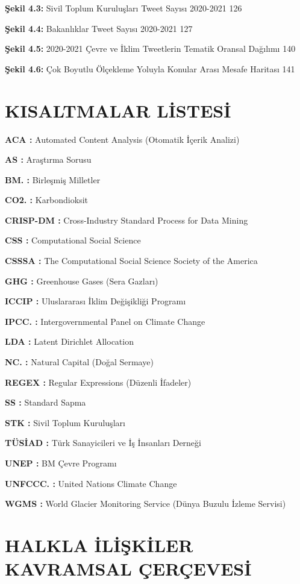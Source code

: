 \documentclass[
]{book}
\begin{document}
\textbf{Şekil 4.3:} Sivil Toplum Kuruluşları Tweet Sayısı 2020-2021 126

\textbf{Şekil 4.4:} Bakanlıklar Tweet Sayısı 2020-2021 127

\textbf{Şekil 4.5:} 2020-2021 Çevre ve İklim Tweetlerin Tematik Oransal Dağılımı 140

\textbf{Şekil 4.6:} Çok Boyutlu Ölçekleme Yoluyla Konular Arası Mesafe Haritası 141

\hypertarget{kisaltmalar-listesi}{%
\chapter*{KISALTMALAR LİSTESİ}\label{kisaltmalar-listesi}}

\textbf{ACA :} Automated Content Analysis (Otomatik İçerik Analizi)

\textbf{AS :} Araştırma Sorusu

\textbf{BM. :} Birleşmiş Milletler

\textbf{CO2. :} Karbondioksit

\textbf{CRISP-DM :} Cross-Industry Standard Process for Data Mining

\textbf{CSS :} Computational Social Science

\textbf{CSSSA :} The Computational Social Science Society of the America

\textbf{GHG :} Greenhouse Gases (Sera Gazları)

\textbf{ICCIP :} Uluslararası İklim Değişikliği Programı

\textbf{IPCC. :} Intergovernmental Panel on Climate Change

\textbf{LDA :} Latent Dirichlet Allocation

\textbf{NC. :} Natural Capital (Doğal Sermaye)

\textbf{REGEX :} Regular Expressions (Düzenli İfadeler)

\textbf{SS :} Standard Sapma

\textbf{STK :} Sivil Toplum Kuruluşları

\textbf{TÜSİAD :} Türk Sanayicileri ve İş İnsanları Derneği

\textbf{UNEP :} BM Çevre Programı

\textbf{UNFCCC. :} United Nations Climate Change

\textbf{WGMS :} World Glacier Monitoring Service (Dünya Buzulu İzleme Servisi)

\hypertarget{intro}{%
\chapter{HALKLA İLİŞKİLER KAVRAMSAL ÇERÇEVESİ}\label{intro}}
\end{document}
